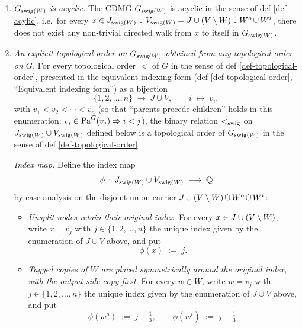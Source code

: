 \documentclass[main]{subfiles}
\begin{document}
\begin{Rem}[SwigAcyclic]
    \begin{enumerate}[label=(\alph*)]
        \item \emph{$G_{\mathrm{swig}(W)}$ is acyclic.}
              The CDMG $G_{\mathrm{swig}(W)}$ is acyclic in the sense of def \ref{def-acylic}, i.e.\ for every $x \in J_{\mathrm{swig}(W)} \cup V_{\mathrm{swig}(W)} = J \cup (V \setminus W) \,\dot{\cup}\, W^o \,\dot{\cup}\, W^i$, there does not exist any non-trivial directed walk from $x$ to itself in $G_{\mathrm{swig}(W)}$.

        \item \emph{An explicit topological order on $G_{\mathrm{swig}(W)}$ obtained from any topological order on $G$.}
              For every topological order $<$ of $G$ in the sense of def \ref{def-topological-order}, presented in the equivalent indexing form (def \ref{def-topological-order}, ``Equivalent indexing form'') as a bijection
              \[
                  \{1, 2, \dots, n\} \;\longrightarrow\; J \cup V, \qquad i \;\longmapsto\; v_i,
              \]
              with $v_1 < v_2 < \cdots < v_n$ (so that ``parents precede children'' holds in this enumeration: $v_i \in \mathrm{Pa}^G(v_j) \Rightarrow i < j$), the binary relation $<_{\mathrm{swig}}$ on $J_{\mathrm{swig}(W)} \cup V_{\mathrm{swig}(W)}$ defined below is a topological order of $G_{\mathrm{swig}(W)}$ in the sense of def \ref{def-topological-order}.

              \emph{Index map.}
              Define the index map
              \[ \phi \,:\, J_{\mathrm{swig}(W)} \cup V_{\mathrm{swig}(W)} \;\longrightarrow\; \mathbb{Q} \]
              by case analysis on the disjoint-union carrier $J \cup (V \setminus W) \,\dot{\cup}\, W^o \,\dot{\cup}\, W^i$:
              \begin{itemize}
                  \item \emph{Unsplit nodes retain their original index.}
                        For every $x \in J \cup (V \setminus W)$, write $x = v_j$ with $j \in \{1, 2, \dots, n\}$ the unique index given by the enumeration of $J \cup V$ above, and put
                        \[ \phi(x) \;:=\; j. \]
                  \item \emph{Tagged copies of $W$ are placed symmetrically around the original index, with the output-side copy first.}
                        For every $w \in W$, write $w = v_j$ with $j \in \{1, 2, \dots, n\}$ the unique index given by the enumeration of $J \cup V$ above, and put
                        \[
                            \phi(w^o) \;:=\; j - \tfrac{1}{3}, \qquad \phi(w^i) \;:=\; j + \tfrac{1}{3}.
                        \]
              \end{itemize}


\end{enumerate}
\end{Rem}
\end{document}
